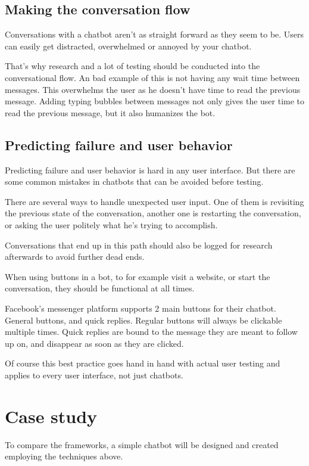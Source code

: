 \subsection{Making the conversation flow}

Conversations with a chatbot aren't as straight forward as they seem to be. Users can easily get distracted, overwhelmed or annoyed by your chatbot.

That's why research and a lot of testing should be conducted into the conversational flow. An bad example of this is not having any wait time between messages. This overwhelms the user as he doesn't have time to read the previous message. Adding typing bubbles between messages not only gives the user time to read the previous message, but it also humanizes the bot.

\subsection{Predicting failure and user behavior}

Predicting failure and user behavior is hard in any user interface. But there are some common mistakes in chatbots that can be avoided before testing.

There are several ways to handle unexpected user input.
One of them is revisiting the previous state of the conversation, another one is restarting the conversation, or asking the user politely what he's trying to accomplish.

Conversations that end up in this path should also be logged for research afterwards to avoid further dead ends.

When using buttons in a bot, to for example visit a website, or start the conversation, they should be functional at all times.

Facebook's messenger platform supports 2 main buttons for their chatbot. General buttons, and quick replies. Regular buttons will always be clickable multiple times. Quick replies are bound to the message they are meant to follow up on, and disappear as soon as they are clicked.

Of course this best practice goes hand in hand with actual user testing and applies to every user interface, not just chatbots.

\section{Case study}

To compare the frameworks, a simple chatbot will be designed and created employing the techniques above.

